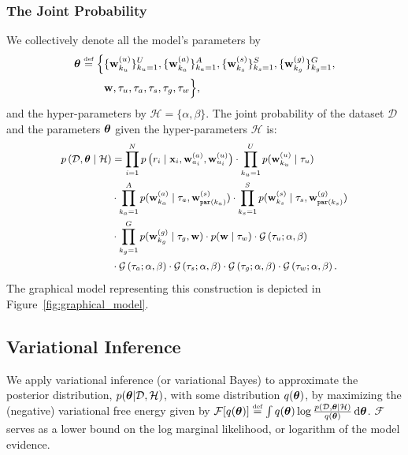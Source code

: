 \subsubsection{The Joint Probability}
We collectively denote all the model's parameters by 
\begin{align*}
	\btheta \defined \Big\{
	& \{ \w_{k_u}^{(u)} \}_{k_u=1}^U, \{ \w_{k_a}^{(a)} \}_{k_a=1}^A, \{ \w_{k_s}^{(s)} \}_{k_s=1}^S, \{ \w_{k_g}^{(g)} \}_{k_g=1}^G,\\
	& \w, \tau_u, \tau_a, \tau_s, \tau_g, \tau_w \Big\},
	\label{eq:paramters}
\end{align*} 
and the hyper-parameters by $\mathcal{H}= \{ \alpha , \beta \} $.
The joint probability of the dataset $\mathcal{D}$ and the parameters $\bm{\theta}$ given the hyper-parameters $\mathcal{H}$ is: 
\begin{equation}
\begingroup\makeatletter\def\f@size{\fsize}\check@mathfonts
\def\maketag@@@#1{\hbox{\m@th\large\normalfont#1}}%
\begin{aligned}
p\left(\mathcal{D}, \btheta \mid \mathcal{H} \right)& = \prod_{i=1}^N p\left( r_i \mid \x_i , \w^{(a)}_{a_i}, \w^{(u)}_{u_i} \right) \cdot \prod_{k_u=1}^Up(\w^{(u)}_{k_u} \mid \tau_u ) \\
& \cdot \prod_{k_a=1}^Ap(\w^{(a)}_{k_a} \mid \tau_a, \w^{(s)}_{\parent(k_a)} ) 
\cdot \prod_{k_s=1}^S p(\w^{(s)}_{k_s} \mid \tau_s, \w^{(g)}_{\parent(k_s)} ) \\
& \cdot \prod_{k_g=1}^G p(\w^{(g)}_{k_g} \mid \tau_g, \w) \cdot p(\w \mid \tau_w ) \cdot \mathcal{G} \left(\tau_u ; \alpha, \beta \right)  \\
& \cdot \mathcal{G}\left(\tau_a ; \alpha, \beta \right) 
\cdot \mathcal{G}\left(\tau_s ; \alpha, \beta \right) 
\cdot \mathcal{G}\left(\tau_g ; \alpha, \beta \right)
\cdot \mathcal{G}\left(\tau_w ; \alpha, \beta \right).
\label{eq:joint-likelihood}
\end{aligned}\endgroup
\end{equation} 
The graphical model representing this construction is depicted in Figure~\ref{fig:graphical_model}.



\subsection{Variational Inference}
We apply variational inference (or variational Bayes) to approximate the posterior distribution,
$p(\bm{\theta} | \mathcal{D}, \mathcal{H} )$,  with some distribution $q(\bm{\theta})$,
by maximizing the (negative) variational free energy given by
$
\mathcal{F} [ q(\btheta) ] \defined \int q(\btheta) \log \frac{p(\mathcal{D}, \btheta | \mathcal{H})}{q(\btheta)} \, \mathrm{d} \btheta
$.
$\mathcal{F}$ serves as a lower bound on the log marginal likelihood, or logarithm of the model evidence. 

